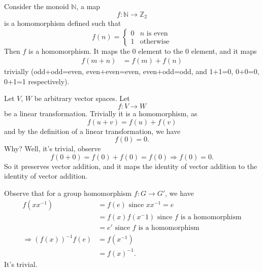 \begin{ex}
Consider the monoid $\mathbb{N}$, a map
\begin{equation}
f:\mathbb{N}\to\mathbb{Z}_2
\end{equation}
is a homomorphism defined such that
\begin{equation}
f(n) = \begin{cases}0 &\text{$n$ is even}\\
1 &\text{otherwise}\end{cases}
\end{equation}
Then $f$ is a homomorphism. It maps the 0 element to the 0
element, and it maps 
\begin{align*}
f(m+n) &= f(m)+f(n)
\end{align*} 
trivially (odd+odd=even, even+even=even, even+odd=odd, and
1+1=0, 0+0=0, 0+1=1 respectively). \qef
\end{ex}
\begin{ex}
Let $V$, $W$ be arbitrary vector spaces. Let
\begin{equation}
f:V\to W
\end{equation}
be a linear transformation. Trivially it is a homomorphism,
as
\begin{equation}
f(u+v)=f(u)+f(v)
\end{equation} 
and by the definition of a linear transformation, we have
\begin{equation}
f(0)=0.
\end{equation}
Why? Well, it's trivial, observe
\begin{equation}
f(0+0)=f(0)+f(0)=f(0)\Rightarrow f(0)=0.
\end{equation}
So it preserves vector addition, and it maps the identity of
vector addition to the identity of vector addition. \qef
\end{ex}

Observe that for a group homomorphism $f:G\to G'$, we have
\begin{align*}
f(xx^{-1}) &= f(e)\text{ since }xx^{-1}=e\\
&= f(x)f(x^-1)\text{ since $f$ is a homomorphism}\\
&= e'\text{ since $f$ is a homomorphism}\\
\Rightarrow \left(f(x)\right)^{-1}f(e) &= f(x^{-1})\\
&= f(x)^{-1}.
\end{align*}
It's trivial.

